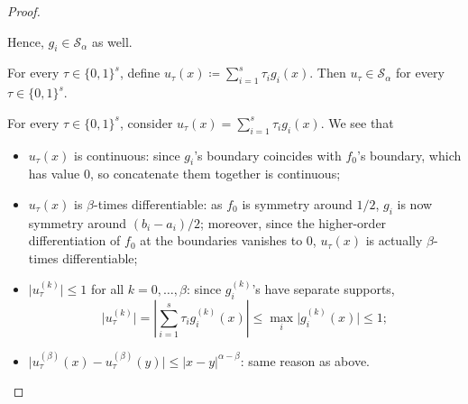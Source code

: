 \begin{proof}
\begin{explanation}
		Hence, \(g_i \in \mathcal{S} _\alpha \) as well.
	\end{explanation}
	\begin{claim}
		For every \(\tau \in \{ 0, 1 \} ^s\), define \(u_{\tau } (x) \coloneqq \sum_{i=1}^{s} \tau _i g_i(x)\). Then \(u_ \tau \in \mathcal{S} _\alpha \) for every \(\tau \in \{ 0, 1 \} ^s\).
	\end{claim}
	\begin{explanation}
		For every \(\tau \in \{ 0, 1 \} ^s\), consider \(u_{\tau } (x) = \sum_{i=1}^{s} \tau _i g_i(x)\). We see that
		\begin{itemize}
			\item \(u_{\tau } (x)\) is continuous: since \(g_i\)'s boundary coincides with \(f_0\)'s boundary, which has value \(0\), so concatenate them together is continuous;
			\item \(u_{\tau } (x)\) is \(\beta \)-times differentiable: as \(f_0\) is symmetry around \(1 / 2\), \(g_i\) is now symmetry around \((b_i - a_i) / 2\); moreover, since the higher-order differentiation of \(f_0\) at the boundaries vanishes to \(0\), \(u_{\tau }(x) \) is actually \(\beta \)-times differentiable;
			\item \(\vert u_{\tau } ^{(k)} \vert \leq 1\) for all \(k = 0, \dots , \beta \): since \(g_i^{(k)}\)'s have separate supports,
			      \[
				      \vert u_{\tau }^{(k)} \vert
				      = \left\vert \sum_{i=1}^{s} \tau _i g_i^{(k)}(x) \right\vert
				      \leq \max _i \vert g_i^{(k)}(x) \vert
				      \leq 1;
			      \]
			\item \(\vert u_{\tau } ^{(\beta )}(x) - u_{\tau } ^{(\beta )}(y) \vert \leq \vert x - y \vert ^{\alpha - \beta }\): same reason as above.
		\end{itemize}
	\end{explanation}


\end{proof}

